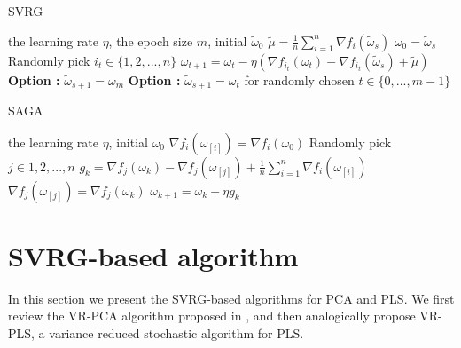 \documentclass[conference]{IEEEtran}
\begin{document}
  \begin{algorithm}[t]
 	\caption{\textsc{SVRG}}
	\label{SVRG}
	\begin{algorithmic}[1]
	\Require the learning rate $\eta$,  the epoch size $m$, initial $\tilde{\omega}_0$
		\State $\tilde{\mu} = \frac{1}{n}\sum\limits_{i=1}^{n}\nabla f_{i}(\tilde{\omega}_{s})$
		\State $\omega_0 = \tilde{\omega}_s$
			\State Randomly pick $i_t\in\{1, 2, ..., n\}$
			\State $\omega_{t+1} = \omega_{t} - \eta(\nabla f_{i_t}(\omega_{t}) - \nabla f_{i_t}(\tilde{\omega}_s)+\tilde{\mu})$
		\EndFor
		\State \textbf{Option \uppercase\expandafter{}:} $\tilde{\omega}_{s+1} = \omega_{m}$
		\State \textbf{Option \uppercase\expandafter{}:} $\tilde{\omega}_{s+1} = \omega_{t}$ for randomly chosen $t \in \{0, ... ,m - 1\}$ 
	\EndFor
	\end{algorithmic}
\end{algorithm}


\begin{algorithm}[t]
	\caption{\textsc{SAGA}}
	\label{SAGA}
	\begin{algorithmic}[1]
	\Require the learning rate $\eta$,  initial $\omega_0$
		\State $\nabla f_{i}(\omega_{[i]}) = \nabla f_{i}(\omega_{0})$
	\EndFor
		\State Randomly pick $j\in{1, 2, ..., n}$
		\State $g_k = \nabla f_{j}(\omega_{k}) - \nabla f_{j}(\omega_{[j]}) + \frac{1}{n} \sum\limits_{i=1}^{n}\nabla f_{i}(\omega_{[i]})$
		\State $\nabla f_{j}(\omega_{[j]}) = \nabla f_{j}(\omega_{k})$
		\State $\omega_{k+1} = \omega_{k} - \eta g_k$
		
	\EndFor 
	\end{algorithmic}

\end{algorithm}

 
 \section{SVRG-based algorithm}
 \label{SVRG-based}
 In this section we present the SVRG-based algorithms for PCA and PLS. We first review the VR-PCA algorithm proposed in \citep{Shamir2015A}, and then analogically propose VR-PLS, a variance reduced stochastic algorithm for PLS.
\end{document}

